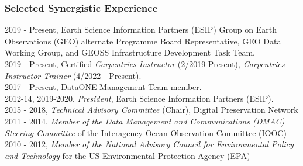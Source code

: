 \documentclass[]{article}
\begin{document}
\subsubsection{Selected Synergistic
Experience}\label{selected-synergistic-experience}

2019 - Present, Earth Science Information Partners (ESIP) Group on Earth
Observations (GEO) alternate Programme Board Representative, GEO Data
Working Group, and GEOSS Infrastructure Development Task Team.\\
2019 - Present, Certified \emph{Carpentries Instructor}
(2/2019-Present), \emph{Carpentries Instructor Trainer} (4/2022 -
Present).\\
2017 - Present, DataONE Management Team member.\\
2012-14, 2019-2020, \emph{President}, Earth Science Information Partners
(ESIP).\\
2015 - 2018, \emph{Technical Advisory Committee} (Chair), Digital
Preservation Network\\
2011 - 2014, \emph{Member of the Data Management and Communications
(DMAC) Steering Committee} of the Interagency Ocean Observation
Committee (IOOC)\\
2010 - 2012, \emph{Member of the National Advisory Council for
Environmental Policy and Technology} for the US Environmental Protection
Agency (EPA)
\end{document}
